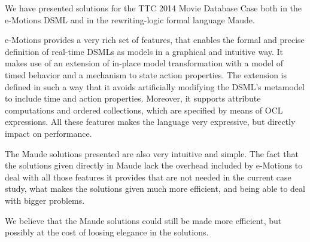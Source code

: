
We have presented solutions for the TTC 2014 Movie Database Case both in the e-Motions DSML and in the rewriting-logic formal language Maude. 

e-Motions provides a very rich set of features, that enables the formal and precise definition of real-time DSMLs as models in a graphical and intuitive way. It makes use of an extension of in-place model transformation with a model of timed behavior and a mechanism to state action properties. The extension is defined in such a way that it avoids artificially modifying the DSML's metamodel to include time and action properties. Moreover, it supports attribute computations and ordered collections, which are specified by means of OCL
expressions. All these features makes the language very expressive, but directly impact on performance. 

The Maude solutions presented are also very intuitive and simple. The fact that the solutions given directly in Maude lack the overhead included by e-Motions to deal with all those features it provides that are not needed in the current case study, what makes the solutions given much more efficient, and being able to deal with bigger problems. 

We believe that the Maude solutions could still be made more efficient, but possibly at the cost of loosing elegance in the solutions. 
